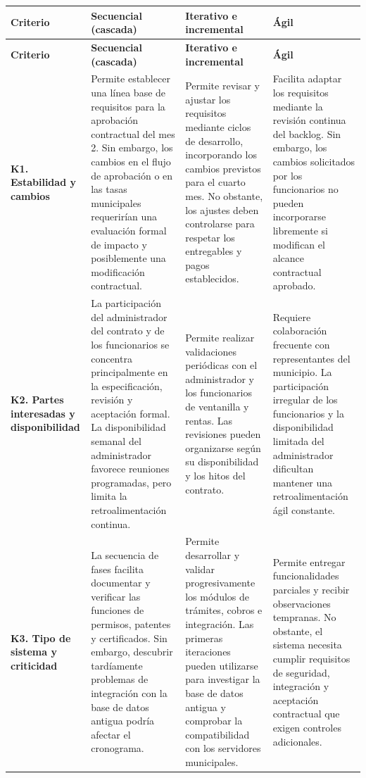 \begin{longtable}{
|>{\raggedright\arraybackslash}p{}
|>{\raggedright\arraybackslash}p{}
|>{\raggedright\arraybackslash}p{}
|>{\raggedright\arraybackslash}p{}|}
\hline
\textbf{Criterio} &
\textbf{Secuencial (cascada)} &
\textbf{Iterativo e incremental} &
\textbf{Ágil} \\
\hline
\endfirsthead

\hline
\textbf{Criterio} &
\textbf{Secuencial (cascada)} &
\textbf{Iterativo e incremental} &
\textbf{Ágil} \\
\hline
\endhead

\textbf{K1. Estabilidad y cambios} &
Permite establecer una línea base de requisitos para la aprobación contractual del mes 2. Sin embargo, los cambios en el flujo de aprobación o en las tasas municipales requerirían una evaluación formal de impacto y posiblemente una modificación contractual. &
Permite revisar y ajustar los requisitos mediante ciclos de desarrollo, incorporando los cambios previstos para el cuarto mes. No obstante, los ajustes deben controlarse para respetar los entregables y pagos establecidos. &
Facilita adaptar los requisitos mediante la revisión continua del backlog. Sin embargo, los cambios solicitados por los funcionarios no pueden incorporarse libremente si modifican el alcance contractual aprobado. \\
\hline

\textbf{K2. Partes interesadas y disponibilidad} &
La participación del administrador del contrato y de los funcionarios se concentra principalmente en la especificación, revisión y aceptación formal. La disponibilidad semanal del administrador favorece reuniones programadas, pero limita la retroalimentación continua. &
Permite realizar validaciones periódicas con el administrador y los funcionarios de ventanilla y rentas. Las revisiones pueden organizarse según su disponibilidad y los hitos del contrato. &
Requiere colaboración frecuente con representantes del municipio. La participación irregular de los funcionarios y la disponibilidad limitada del administrador dificultan mantener una retroalimentación ágil constante. \\
\hline

\textbf{K3. Tipo de sistema y criticidad} &
La secuencia de fases facilita documentar y verificar las funciones de permisos, patentes y certificados. Sin embargo, descubrir tardíamente problemas de integración con la base de datos antigua podría afectar el cronograma. &
Permite desarrollar y validar progresivamente los módulos de trámites, cobros e integración. Las primeras iteraciones pueden utilizarse para investigar la base de datos antigua y comprobar la compatibilidad con los servidores municipales. &
Permite entregar funcionalidades parciales y recibir observaciones tempranas. No obstante, el sistema necesita cumplir requisitos de seguridad, integración y aceptación contractual que exigen controles adicionales. \\
\hline


\end{longtable}
